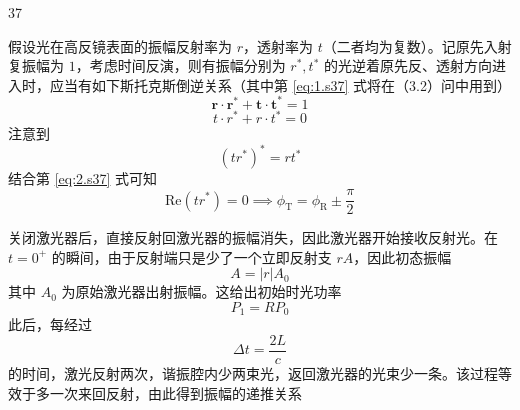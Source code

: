 \begin{solution}{37}
    \begin{subsolution}
        假设光在高反镜表面的振幅反射率为 $r$，透射率为 $t$（二者均为复数）。记原先入射复振幅为 $1$，考虑时间反演，则有振幅分别为 $r^{*}, t^{*}$ 的光逆着原先反、透射方向进入时，应当有如下斯托克斯倒逆关系（其中第 \eqref{eq:1.s37} 式将在（3.2）问中用到）
        \begin{equation}
            \boldsymbol {r} \cdot \boldsymbol {r} ^ {*} + \boldsymbol {t} \cdot \boldsymbol {t} ^ {*} = 1
            \label{eq:1.s37}
        \end{equation}
        \begin{equation}
            t \cdot r ^ {*} + r \cdot t ^ {*} = 0
            \label{eq:2.s37}
        \end{equation}
        注意到
        \begin{equation}
            (t r ^ {*}) ^ {*} = r t ^ {*}
            \label{eq:3.s37}
        \end{equation}
        结合第 \eqref{eq:2.s37} 式可知
        \begin{equation}
            \mathrm{Re} (t r ^ {*}) = 0 \implies \phi_ {\mathrm{T}} = \phi_ {\mathrm{R}} \pm \frac {\pi}{2}
            \label{eq:4.s37}
        \end{equation}
    \end{subsolution}
    \begin{subsolution}
        \begin{subsubsolution}
            关闭激光器后，直接反射回激光器的振幅消失，因此激光器开始接收反射光。在 $t = 0^{+}$ 的瞬间，由于反射端只是少了一个立即反射支 $rA$，因此初态振幅
            \begin{equation}
                A = | r | A _ {0}
                \label{eq:5.s37}
            \end{equation}
            其中 $A_{0}$ 为原始激光器出射振幅。这给出初始时光功率
            \begin{equation}
                P _ {1} = R P _ {0}
                \label{eq:6.s37}
            \end{equation}
            此后，每经过
            \begin{equation}
                \Delta t = \frac {2 L}{c}
                \label{eq:7.s37}
            \end{equation}
            的时间，激光反射两次，谐振腔内少两束光，返回激光器的光束少一条。该过程等效于多一次来回反射，由此得到振幅的递推关系
            \begin{equation}

\end{equation}
\end{subsubsolution}
\end{subsolution}
\end{solution}
